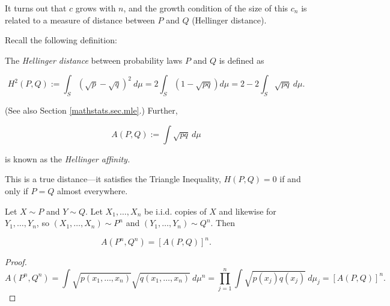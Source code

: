 It turns out that \(c\) grows with \(n\), and the growth condition of the size of this \(c_n\) is related to a measure of distance between \(P\) and \(Q\) (Hellinger distance). 

Recall the following definition:

\begin{definition}\label{mathstats.def.hel.dist}

The \textit{Hellinger distance} between probability laws \(P\) and \(Q\) is defined as 

\[
H^2(P,Q) := \int_S (\sqrt{p} - \sqrt{q})^2 \ d\mu = 2 \int_S (1 - \sqrt{pq}) d \mu = 2 - 2 \int_S \sqrt{pq} \ d\mu.
\]

(See also Section \ref{mathstats.sec.mle}.) Further,

\[
A(P,Q) := \int \sqrt{pq} \ d\mu
\]

is known as the \textit{Hellinger affinity.}


\end{definition}

\begin{remark}

This is a true distance---it satisfies the Triangle Inequality, \(H(P,Q) = 0\) if and only if \(P = Q\) almost everywhere.

\end{remark}

\begin{lemma}

Let \(X \sim P\) and \(Y \sim Q\). Let \(X_1, \ldots, X_n\) be i.i.d. copies of \(X\) and likewise for \(Y_1, \ldots, Y_n\), so \((X_1, \ldots, X_n) \sim P^n\) and \((Y_1, \ldots, Y_n) \sim Q^n\). Then

\[
A(P^n, Q^n) =  \left[ A(P, Q) \right]^n.
\]

\end{lemma}

\begin{proof}


\[
A(P^n, Q^n) = \int \sqrt{p(x_1, \ldots, x_n)} \sqrt{ q( x_1, \ldots, x_n) } \ d\mu^n 
= \prod_{j=1}^n \int \sqrt{p(x_j) q(x_j)} \ d\mu_j=  \left[ A(P, Q) \right]^n.
\]

\end{proof}

